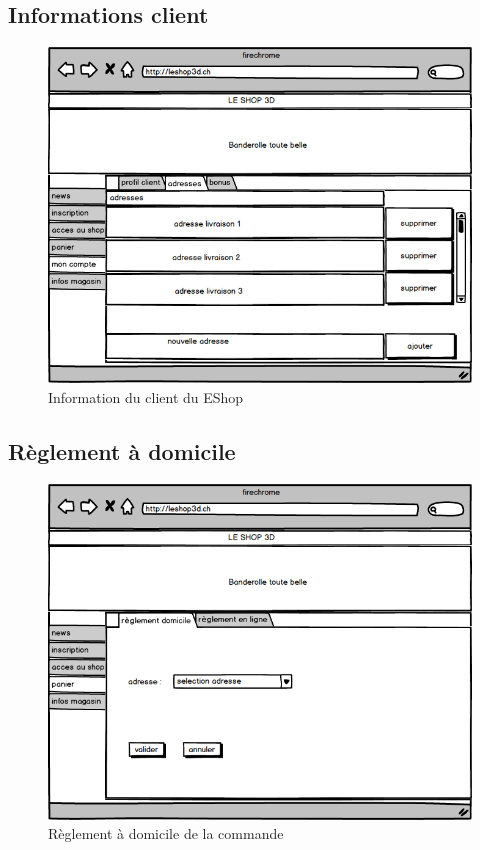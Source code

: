 \documentclass[12pt]{article}
\begin{document}
\subsection{Informations client}

\begin{figure}[ht]
    \center
    \includegraphics[scale=0.6]{../Maquettes/compte_client_adresse.jpeg}
    \caption*{Information du client du EShop}
\end{figure}

\subsection{Règlement à domicile}

\begin{figure}[ht]
    \center
    \includegraphics[scale=0.6]{../Maquettes/reglement_domicile.jpeg}
    \caption*{Règlement à domicile de la commande}
\end{figure}
\end{document}
